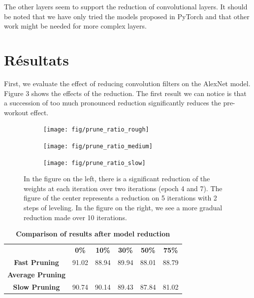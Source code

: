 \documentclass[12pt]{article}
\begin{document}
The other layers seem to support the reduction of convolutional layers. It should be noted that we have only tried the models proposed in PyTorch and that other work might be needed for more complex layers.

\section*{Résultats}
First, we evaluate the effect of reducing convolution filters on the AlexNet model. Figure 3 shows the effects of the reduction. The first result we can notice is that a succession of too much pronounced reduction significantly reduces the pre-workout effect.
\begin{figure}[H]
	\centering
	\begin{subfigure}[b]{0.33\textwidth}            
		\texttt{[image: fig/prune\_ratio\_rough]}
		\label{fig:pruneratiorough}
	\end{subfigure}%
	\begin{subfigure}[b]{0.33\textwidth}
		\centering
		\texttt{[image: fig/prune\_ratio\_medium]}
		\label{fig:pruneratioslow}
	\end{subfigure}
	\begin{subfigure}[b]{0.33\textwidth}
		\centering
		\texttt{[image: fig/prune\_ratio\_slow]}
		\label{fig:pruneratioslow}
	\end{subfigure}
	\caption{In the figure on the left, there is a significant reduction of the weights at each iteration over two iterations (epoch 4 and 7). The figure of the center represents a reduction on 5 iterations with 2 steps of leveling. In the figure on the right, we see a more gradual reduction made over 10 iterations.}
\end{figure}

\begin{table}[H]
	\centering
	\caption {\textbf{Comparison of results after model reduction}}
	\begin{tabular}{clllll}
		\textbf{}                & \multicolumn{1}{c}{\textbf{0\%}} & \multicolumn{1}{c}{\textbf{10\%}} & \multicolumn{1}{c}{\textbf{30\%}} & \multicolumn{1}{c}{\textbf{50\%}} & \multicolumn{1}{c}{\textbf{75\%}} \\
		\textbf{Fast Pruning}    & 91.02                            & 88.94                             & 89.94                             & 88.01                             & 88.79                             \\
		\textbf{Average Pruning} &                                  &                                   &                                   &                                   &                                   \\
		\textbf{Slow Pruning}    & 90.74                            & 90.14                             & 89.43                             & 87.84                             & 81.02                            
	\end{tabular}
\end{table}
\end{document}
